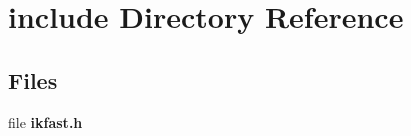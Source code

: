 \section{include Directory Reference}
\label{dir_d44c64559bbebec7f509842c48db8b23}
\subsection*{Files}
\begin{DoxyCompactItemize}
\item 
file {\bfseries ikfast.\-h}
\end{DoxyCompactItemize}
